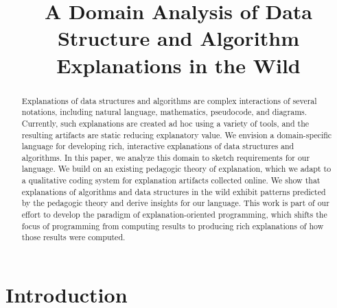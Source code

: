 \documentclass[conference]{IEEEtran}
\begin{document}
\title{A Domain Analysis of Data Structure and Algorithm Explanations in the Wild}



\author{
\IEEEauthorblockA{}
}

\maketitle


\begin{abstract}
Explanations of data structures and algorithms are complex interactions of
several notations, including natural language, mathematics, pseudocode, and
diagrams. Currently, such explanations are created ad hoc using a variety of
tools, and the resulting artifacts are static reducing explanatory value. We
envision a domain-specific language for developing rich, interactive
explanations of data structures and algorithms. In this paper, we analyze this
domain to sketch requirements for our language. We build on an existing
pedagogic theory of explanation, which we adapt to a qualitative coding system
for explanation artifacts collected online. We show that explanations of
algorithms and data structures in the wild exhibit patterns predicted by the
pedagogic theory and derive insights for our language. This work is part of our
effort to develop the paradigm of explanation-oriented programming, which
shifts the focus of programming from computing results to producing rich
explanations of how those results were computed.
\end{abstract}


\IEEEpeerreviewmaketitle


\section{Introduction}
\label{sec:intro}
\end{document}
